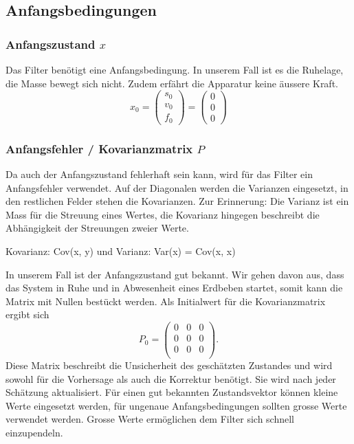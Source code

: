\subsection{Anfangsbedingungen}
\subsubsection*{Anfangszustand $x$}
Das Filter benötigt eine Anfangsbedingung. 
In unserem Fall ist es die Ruhelage, die Masse bewegt sich nicht. 
Zudem erfährt die Apparatur keine äussere Kraft.
\[ {x_0 }= \left( \begin{array}{c} {s_0}\\ {v_0}\\{f_0}\end{array}\right) = \left( \begin{array}{c} 0\\ 0\\ 0\end{array}\right) \]

\subsubsection*{Anfangsfehler / Kovarianzmatrix $P$}
Da auch der Anfangszustand fehlerhaft sein kann, wird für das Filter ein Anfangsfehler verwendet. 
Auf der Diagonalen werden die Varianzen eingesetzt, in den restlichen Felder stehen die Kovarianzen.
Zur Erinnerung: Die Varianz ist ein Mass für die Streuung eines Wertes, die Kovarianz hingegen beschreibt die Abhängigkeit der Streuungen zweier Werte.

Kovarianz: Cov(x, y) und Varianz: Var(x) = Cov(x, x)

In unserem Fall ist der Anfangszustand gut bekannt. 
Wir gehen davon aus, dass das System in Ruhe und in Abwesenheit eines Erdbeben startet, somit kann die Matrix mit Nullen bestückt werden. 
Als Initialwert für die Kovarianzmatrix ergibt sich
\[ 
{P_0 }=
\left(
\begin{array}{ccc} 	
0 & 0 &0 \\ 
0 &0 & 0 \\ 
0 & 0 &0 \\
\end{array}
\right).
 \] 
Diese Matrix beschreibt die Unsicherheit des geschätzten Zustandes und wird sowohl für die Vorhersage als auch die Korrektur benötigt. 
Sie wird nach jeder Schätzung aktualisiert. 
Für einen gut bekannten Zustandsvektor können kleine Werte eingesetzt werden, für ungenaue Anfangsbedingungen sollten grosse Werte verwendet werden. 
Grosse Werte ermöglichen dem Filter sich schnell einzupendeln. 


